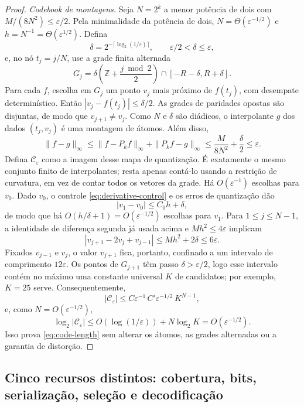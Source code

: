 \documentclass[11pt,a4paper]{article}
\theoremstyle{definition}
\theoremstyle{remark}
\begin{document}
\begin{proof}
\emph{Codebook de montagens.} Seja $N=2^k$ a menor potência de dois com $M/(8N^2)\le\varepsilon/2$. Pela minimalidade da potência de dois, $N=\Theta(\varepsilon^{-1/2})$ e $h=N^{-1}=\Theta(\varepsilon^{1/2})$. Defina
\[
 \delta=2^{-\lceil\log_2(1/\varepsilon)\rceil},
 \qquad \varepsilon/2<\delta\le\varepsilon,
\]
e, no nó $t_j=j/N$, use a grade finita alternada
\begin{equation}
 G_j=\delta\left(\mathbb{Z}+\frac{j\bmod2}{2}\right)
 \cap[-R-\delta,R+\delta].
 \label{eq:alternating-grid}
\end{equation}
Para cada $f$, escolha em $G_j$ um ponto $v_j$ mais próximo de $f(t_j)$, com desempate determinístico. Então $|v_j-f(t_j)|\le\delta/2$. As grades de paridades opostas são disjuntas, de modo que $v_{j+1}\neq v_j$. Como $N$ e $\delta$ são diádicos, o interpolante $g$ dos dados $(t_j,v_j)$ é uma montagem de átomos. Além disso,
\[
 \|f-g\|_\infty
 \le\|f-P_kf\|_\infty+\|P_kf-g\|_\infty
 \le\frac{M}{8N^2}+\frac\delta2\le\varepsilon.
\]
Defina $\mathcal C_\varepsilon$ como a imagem desse mapa de quantização.
É exatamente o mesmo conjunto finito de interpolantes; resta apenas contá-lo
usando a restrição de curvatura, em vez de contar todos os vetores da grade.
Há $O(\varepsilon^{-1})$ escolhas para $v_0$. Dado $v_0$, o controle
\eqref{eq:derivative-control} e os erros de quantização dão
\[
 |v_1-v_0|\le C_0h+\delta,
\]
de modo que há $O(h/\delta+1)=O(\varepsilon^{-1/2})$ escolhas para $v_1$.
Para $1\le j\le N-1$, a identidade de diferença segunda já usada acima e
$Mh^2\le4\varepsilon$ implicam
\[
 |v_{j+1}-2v_j+v_{j-1}|
 \le Mh^2+2\delta\le6\varepsilon.
\]
Fixados $v_{j-1}$ e $v_j$, o valor $v_{j+1}$ fica, portanto, confinado a um
intervalo de comprimento $12\varepsilon$. Os pontos de $G_{j+1}$ têm passo
$\delta>\varepsilon/2$, logo esse intervalo contém no máximo uma constante
universal $K$ de candidatos; por exemplo, $K=25$ serve. Consequentemente,
\[
 |\mathcal C_\varepsilon|
 \le C\varepsilon^{-1}\,C'\varepsilon^{-1/2}\,K^{N-1},
\]
e, como $N=O(\varepsilon^{-1/2})$,
\[
 \log_2|\mathcal C_\varepsilon|
 \le O(\log(1/\varepsilon))+N\log_2K
 =O(\varepsilon^{-1/2}).
\]
Isso prova \eqref{eq:code-length} sem alterar os átomos, as grades alternadas
ou a garantia de distorção.
\end{proof}

\subsection{Cinco recursos distintos: cobertura, bits, serialização, seleção e decodificação}
\end{document}
